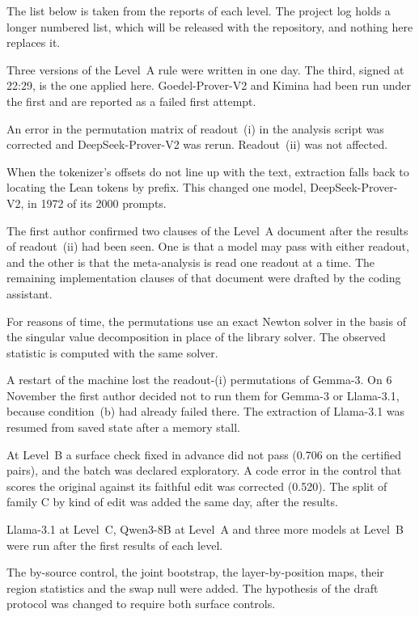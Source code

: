 \documentclass[10pt]{article}
\begin{document}
The list below is taken from the reports of each level. The project log holds a longer numbered list, which will be
released with the repository, and nothing here replaces it.

\begin{description}[leftmargin=1.2em]
\item[4 Nov] Three versions of the Level~A rule were written in one day. The third, signed at 22:29, is the one
applied here. Goedel-Prover-V2 and Kimina had been run under the first and are reported as a failed first attempt.
\item[5 Nov, 08:37] An error in the permutation matrix of readout~(i) in the analysis script was corrected and
DeepSeek-Prover-V2 was rerun. Readout~(ii) was not affected.
\item[5 Nov] When the tokenizer's offsets do not line up with the text, extraction falls back to locating the Lean
tokens by prefix. This changed one model, DeepSeek-Prover-V2, in 1972 of its 2000 prompts.
\item[5 Nov] The first author confirmed two clauses of the Level~A document after the results of readout~(ii) had
been seen. One is that a model may pass with either readout, and the other is that the meta-analysis is read one
readout at a time. The remaining implementation clauses of that document were drafted by the coding assistant.
\item[5 Nov] For reasons of time, the permutations use an exact Newton solver in the basis of the singular value
decomposition in place of the library solver. The observed statistic is computed with the same solver.
\item[5--6 Nov] A restart of the machine lost the readout-(i) permutations of Gemma-3. On 6 November the first
author decided not to run them for Gemma-3 or Llama-3.1, because condition~(b) had already failed there. The
extraction of Llama-3.1 was resumed from saved state after a memory stall.
\item[6 Nov] At Level~B a surface check fixed in advance did not pass (0.706 on the certified pairs), and the
batch was declared exploratory. A code error in the control that scores the original against its faithful edit was
corrected (0.520). The split of family C by kind of edit was added the same day, after the results.
\item[7--8 Nov] Llama-3.1 at Level~C, Qwen3-8B at Level~A and three more models at Level~B were run after the
first results of each level.
\item[9 Nov] The by-source control, the joint bootstrap, the layer-by-position maps, their region statistics and
the swap null were added. The hypothesis of the draft protocol was changed to require both surface controls.
\end{description}
\end{document}
